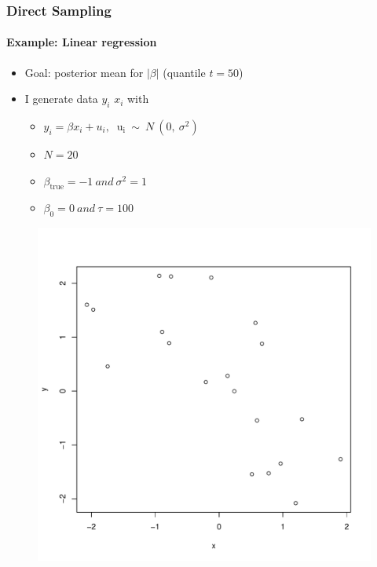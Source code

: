 \documentclass[
  shownotes,
  xcolor={svgnames},
  hyperref={colorlinks,citecolor=DarkBlue,linkcolor=DarkRed,urlcolor=DarkBlue}
  , aspectratio=169]{beamer}
\begin{document}
\begin{frame}[fragile]
\frametitle{Direct Sampling}
\framesubtitle{Example: Linear regression}

\begin{itemize}
\item Goal: posterior mean for $|\beta|$ (quantile $t=50$)
\medskip

\item I generate data $y_{i}$ $x_{i}$ with
\begin{itemize}
\item $ y_{i} = \beta x_{i} + u_{i},\ \text{\ \ u}_{\text{i\ }}\sim\ N\ (0,\ \sigma^{2})$

\item $N = 20$

\item $\beta_{\text{true}} = - 1\ and\ \sigma^{2} = 1$

\item $\beta_{0} = 0\ and\ \tau = 100$
\end{itemize}
\end{itemize}

\begin{figure}[H] \centering
  \centering
  \includegraphics[scale=0.25]{figures/scatter}
  \\
  \tiny 
\end{figure}
\end{frame}
\end{document}
